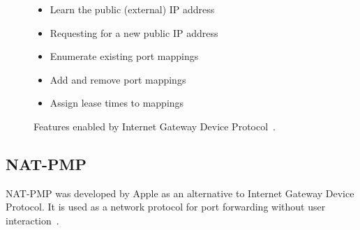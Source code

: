\begin{figure}
\centering
\begin{itemize}
    \item Learn the public (external) IP address
    \item Requesting for a new public IP address
    \item Enumerate existing port mappings
    \item Add and remove port mappings
    \item Assign lease times to mappings
\end{itemize}
\caption{Features enabled by Internet Gateway Device Protocol~\cite{igd:list}.}
\label{fig:igd}
\end{figure}

\subsection{NAT-PMP}
NAT-PMP was developed by Apple as an alternative to Internet Gateway Device Protocol. It is used as a network protocol for port forwarding without user interaction~\cite{nat-pmp}.
